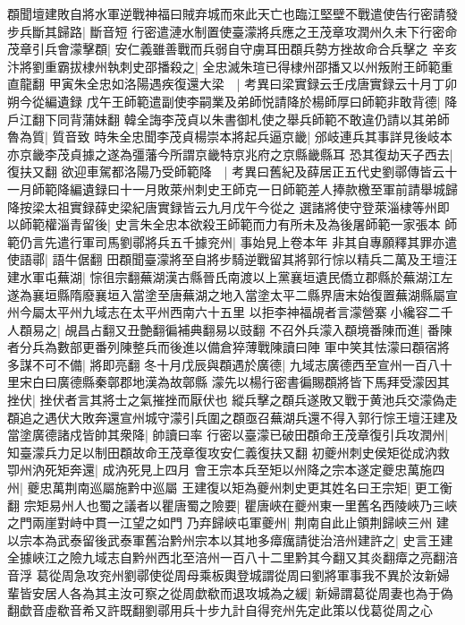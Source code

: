 頵聞壇建敗自將水軍逆戰神福曰賊弃城而來此天亡也臨江堅壁不戰遣使告行密請發步兵斷其歸路|{
	斷音短}
行密遣漣水制置使臺濛將兵應之王茂章攻潤州久未下行密命茂章引兵會濛擊頵|{
	安仁義雖善戰而兵弱自守虜耳田頵兵勢方挫故命合兵擊之}
辛亥汴將劉重霸拔棣州執刺史邵播殺之|{
	全忠滅朱瑄已得棣州邵播又以州叛附王師範重直龍翻}
甲寅朱全忠如洛陽遇疾復還大梁　|{
	考異曰梁實録云壬戌唐實録云十月丁卯朔今從編遺録}
戊午王師範遣副使李嗣業及弟師悦請降於楊師厚曰師範非敢背德|{
	降戶江翻下同背蒲妹翻}
韓全誨李茂貞以朱書御札使之舉兵師範不敢違仍請以其弟師魯為質|{
	質音致}
時朱全忠聞李茂貞楊崇本將起兵逼京畿|{
	邠岐連兵其事詳見後岐本亦京畿李茂貞據之遂為彊藩今所謂京畿特京兆府之京縣畿縣耳}
恐其復劫天子西去|{
	復扶又翻}
欲迎車駕都洛陽乃受師範降　|{
	考異曰舊紀及薛居正五代史劉鄩傳皆云十一月師範降編遺録曰十一月敗萊州刺史王師克一日師範差人捧款檄至軍前請舉城歸降按梁太祖實録薛史梁紀唐實録皆云九月戊午今從之}
選諸將使守登萊淄棣等州即以師範權淄青留後|{
	史言朱全忠本欲殺王師範而力有所未及為後屠師範一家張本}
師範仍言先遣行軍司馬劉鄩將兵五千據兖州|{
	事始見上卷本年}
非其自專願釋其罪亦遣使語鄩|{
	語牛倨翻}
田頵聞臺濛將至自將步騎逆戰留其將郭行悰以精兵二萬及王壇汪建水軍屯蕪湖|{
	悰徂宗翻蕪湖漢古縣晉氏南渡以上黨襄垣遺民僑立郡縣於蕪湖江左遂為襄垣縣隋廢襄垣入當塗至唐蕪湖之地入當塗太平二縣界唐末始復置蕪湖縣屬宣州今屬太平州九域志在太平州西南六十五里}
以拒李神福覘者言濛營寨小纔容二千人頵易之|{
	覘昌占翻又丑艶翻徧補典翻易以豉翻}
不召外兵濛入頵境番陳而進|{
	番陳者分兵為數部更番列陳整兵而後進以備倉猝薄戰陳讀曰陣}
軍中笑其怯濛曰頵宿將多謀不可不備|{
	將即亮翻}
冬十月戊辰與頵遇於廣德|{
	九域志廣德西至宣州一百八十里宋白曰廣德縣秦鄣郡地漢為故鄣縣}
濛先以楊行密書徧賜頵將皆下馬拜受濛因其挫伏|{
	挫伏者言其將士之氣摧挫而厭伏也}
縱兵擊之頵兵遂敗又戰于黄池兵交濛偽走頵追之遇伏大敗奔還宣州城守濛引兵圍之頵亟召蕪湖兵還不得入郭行悰王壇汪建及當塗廣德諸戍皆帥其衆降|{
	帥讀曰率}
行密以臺濛已破田頵命王茂章復引兵攻潤州|{
	知臺濛兵力足以制田頵故命王茂章復攻安仁義復扶又翻}
初夔州刺史侯矩從成汭救卾州汭死矩奔還|{
	成汭死見上四月}
會王宗本兵至矩以州降之宗本遂定夔忠萬施四州|{
	夔忠萬荆南巡屬施黔中巡屬}
王建復以矩為夔州刺史更其姓名曰王宗矩|{
	更工衡翻}
宗矩易州人也蜀之議者以瞿唐蜀之險要|{
	瞿唐峽在夔州東一里舊名西陵峽乃三峽之門兩崖對峙中貫一江望之如門}
乃弃歸峽屯軍夔州|{
	荆南自此止領荆歸峽三州}
建以宗本為武泰留後武泰軍舊治黔州宗本以其地多瘴癘請徙治涪州建許之|{
	史言王建全據峽江之險九域志自黔州西北至涪州一百八十二里黔其今翻又其炎翻瘴之亮翻涪音浮}
葛從周急攻兖州劉鄩使從周母乘板輿登城謂從周曰劉將軍事我不異於汝新婦輩皆安居人各為其主汝可察之從周歔欷而退攻城為之緩|{
	新婦謂葛從周妻也為于偽翻歔音虛欷音希又許既翻劉鄩用兵十步九計自得兖州先定此策以伐葛從周之心}
